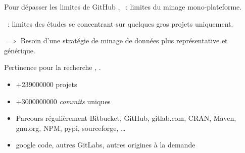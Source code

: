 \documentclass[usenames,dvipsnames,10pt]{beamer}
\newcommand{\mycite}[1]{%
    \citeauthor{#1} \citeyear{#1} \cite{#1}%
}
\begin{document}
\begin{frame}[fragile]{Pour dépasser les limites de GitHub}
    \mycite{mining-github-2014}, \mycite{penumbra-oss-2022} : limites du minage
    mono-plateforme.

    \smallskip

    \mycite{barriers-2018} : limites des études se concentrant sur quelques gros
    projets uniquement.

    \bigskip

    $\implies$ Besoin d'une stratégie de minage de données plus représentative
    et générique.

    \begin{figure}
        
    \end{figure}

\end{frame}

\begin{frame}{Pertinence pour la recherche}
    \mycite{swh-2019}, \mycite{swh-seirl}.

    \begin{itemize}
        \item $+$\num{239000000} projets
        \item $+$\num{3000000000} \emph{commits} uniques
        \item Parcours régulièrement Bitbucket, GitHub, gitlab.com, CRAN, Maven,
            gnu.org, NPM, pypi, sourceforge, \ldots
        \item google code, autres GitLabs, autres origines à la demande
    \end{itemize}

\end{frame}
\end{document}
